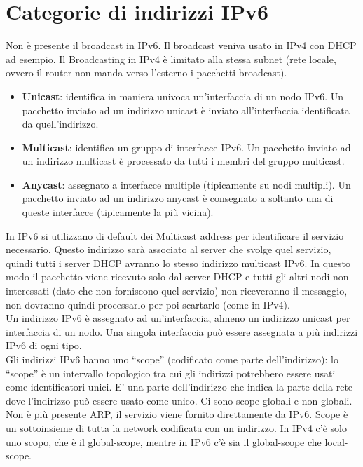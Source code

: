 \documentclass{article}
\begin{document}
\section{Categorie di indirizzi IPv6}
Non è presente il broadcast in IPv6. Il broadcast veniva usato in IPv4 con DHCP ad esempio. Il Broadcasting in IPv4 è limitato alla stessa subnet (rete locale, ovvero il router non manda verso l’esterno i pacchetti broadcast). \\
\begin{itemize}
    \item \textbf{Unicast}: identifica in maniera univoca un’interfaccia di un nodo IPv6. Un pacchetto inviato ad un indirizzo unicast è inviato all’interfaccia identificata da quell’indirizzo.
    \item \textbf{Multicast}: identifica un gruppo di interfacce IPv6. Un pacchetto inviato ad un indirizzo multicast è processato da tutti i membri del gruppo multicast.
    \item \textbf{Anycast}: assegnato a interfacce multiple (tipicamente su nodi multipli). Un pacchetto inviato ad un indirizzo anycast è consegnato a soltanto una di queste interfacce (tipicamente la più vicina).
\end{itemize}
In IPv6 si utilizzano di default dei Multicast address per identificare il servizio necessario. Questo indirizzo sarà associato al server che svolge quel servizio, quindi tutti i server DHCP avranno lo stesso indirizzo multicast IPv6. In questo modo il pacchetto viene ricevuto solo dal server DHCP e tutti gli altri nodi non interessati (dato che non forniscono quel servizio) non riceveranno il messaggio, non dovranno quindi processarlo per poi scartarlo (come in IPv4).\\
Un indirizzo IPv6 è assegnato ad un’interfaccia, almeno un indirizzo unicast per interfaccia di un nodo. Una singola interfaccia può essere assegnata a più indirizzi IPv6 di ogni tipo. \\ 
Gli indirizzi IPv6 hanno uno “scope” (codificato come parte dell’indirizzo): lo “scope” è un intervallo topologico tra cui gli indirizzi potrebbero essere usati come identificatori unici. E’ una parte dell’indirizzo che indica la parte della rete dove l’indirizzo può essere usato come unico. Ci sono scope globali e non globali.\\
Non è più presente ARP, il servizio viene fornito direttamente da IPv6. Scope è un sottoinsieme di tutta la network codificata con un indirizzo. In IPv4 c’è solo uno scopo, che è il global-scope, mentre in IPv6 c’è sia il global-scope che local-scope.
\end{document}
